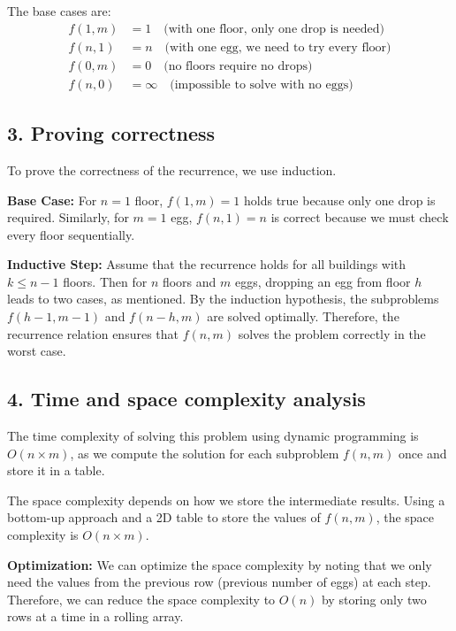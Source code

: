 \documentclass[11pt]{article}
\begin{document}
The base cases are:
\begin{align*}
    f(1, m) &= 1 \quad \text{(with one floor, only one drop is needed)} \\
    f(n, 1) &= n \quad \text{(with one egg, we need to try every floor)} \\
    f(0, m) &= 0 \quad \text{(no floors require no drops)} \\
    f(n, 0) &= \infty \quad \text{(impossible to solve with no eggs)}
\end{align*}

\subsection*{3. Proving correctness}
To prove the correctness of the recurrence, we use induction.

\textbf{Base Case:} For \( n = 1 \) floor, \( f(1, m) = 1 \) holds true because only one drop is required. Similarly, for \( m = 1 \) egg, \( f(n, 1) = n \) is correct because we must check every floor sequentially.

\textbf{Inductive Step:} Assume that the recurrence holds for all buildings with \( k \leq n-1 \) floors. Then for \( n \) floors and \( m \) eggs, dropping an egg from floor \( h \) leads to two cases, as mentioned. By the induction hypothesis, the subproblems \( f(h-1, m-1) \) and \( f(n-h, m) \) are solved optimally. Therefore, the recurrence relation ensures that \( f(n, m) \) solves the problem correctly in the worst case.

\subsection*{4. Time and space complexity analysis}
The time complexity of solving this problem using dynamic programming is \( O(n \times m) \), as we compute the solution for each subproblem \( f(n, m) \) once and store it in a table.

The space complexity depends on how we store the intermediate results. Using a bottom-up approach and a 2D table to store the values of \( f(n, m) \), the space complexity is \( O(n \times m) \).

\textbf{Optimization:} We can optimize the space complexity by noting that we only need the values from the previous row (previous number of eggs) at each step. Therefore, we can reduce the space complexity to \( O(n) \) by storing only two rows at a time in a rolling array.
\end{document}
